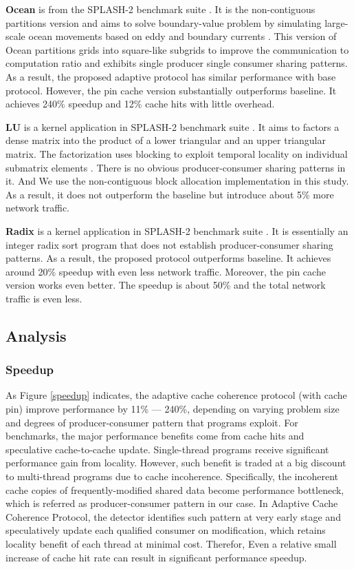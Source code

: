 \documentclass[conference]{IEEEtran}
\begin{document}
\textbf{Ocean} is from the SPLASH-2 benchmark suite \cite{splash}. It is the non-contiguous partitions version and aims to solve boundary-value problem by simulating large-scale ocean movements based on eddy and boundary currents \cite{ocean}. This version of Ocean partitions grids into square-like subgrids to improve the communication to computation ratio and exhibits single producer single consumer sharing patterns. As a result, the proposed adaptive protocol has similar performance with base protocol. However, the pin cache version substantially outperforms baseline. It achieves 240\% speedup and 12\% cache hits with little overhead.

\textbf{LU} is a kernel application in SPLASH-2 benchmark suite \cite{splash}. It aims to factors a dense matrix into the product of a lower triangular and an upper triangular matrix.  The factorization uses blocking to exploit temporal locality on individual submatrix elements \cite{lu}. There is no obvious producer-consumer sharing patterns in it. And We use the non-contiguous block allocation implementation in this study. As a result, it does not outperform the baseline but introduce about 5\% more network traffic.

\textbf{Radix} is a kernel application in SPLASH-2 benchmark suite \cite{splash}. It is essentially an integer radix sort program that does not establish producer-consumer sharing patterns. As a result, the proposed protocol outperforms baseline. It achieves around 20\% speedup with even less network traffic. Moreover, the pin cache version works even better. The speedup is about 50\% and the total network traffic is even less.


\subsection{Analysis}

\subsubsection{Speedup}
As Figure \ref{speedup} indicates, the adaptive cache coherence protocol (with cache pin) improve performance by 11\% --- 240\%, depending on varying problem size and degrees of producer-consumer pattern that programs exploit. For benchmarks, the major performance benefits come from cache hits and speculative cache-to-cache update. Single-thread programs receive significant performance gain from locality. However, such benefit is traded at a big discount to multi-thread programs due to cache incoherence. Specifically, the incoherent cache copies of frequently-modified shared data become performance bottleneck, which is referred as producer-consumer pattern in our case. In Adaptive Cache Coherence Protocol, the detector identifies such pattern at very early stage and speculatively update each qualified consumer on modification, which retains locality benefit of each thread at minimal cost. Therefor, Even a relative small increase of cache hit rate can result in significant performance speedup.
\end{document}
